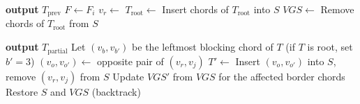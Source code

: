 \begin{algorithm}[htbp]
    \caption{ProcessFace (outer recursion)}
    \label{alg:process_face}
    \begin{algorithmic}[1]
                \State \textbf{output} $T_{\text{prev}}$ 
                \State \Return
            \EndIf
            \State $F \gets F_i$
            \State $v_r \gets$  
            \State $T_{\text{root}} \gets$ 
             
                \State \Return
            \EndIf
            \State Insert chords of $T_{\text{root}}$ into $S$
            \State $VGS \gets$ 
            \State {}
            \State Remove chords of $T_{\text{root}}$ from $S$ 
        \EndProcedure
    \end{algorithmic}
\end{algorithm}

\begin{algorithm}[htbp]
    \caption{DFS (inner recursion over local tree)}
    \label{alg:dfs_local}
    \begin{algorithmic}[1]
                \State \textbf{output} $T_{\text{partial}}$ 
            \Else
                \State {}
            \EndIf
            \State Let $(v_b, v_{b'})$ be the leftmost blocking chord of $T$ (if $T$ is root, set $b' = 3$)
                \State $(v_o, v_{o'}) \gets$ opposite pair of $(v_r, v_j)$
                \State $T' \gets$  
                \State Insert $(v_o, v_{o'})$ into $S$, remove $(v_r, v_j)$ from $S$
                \State Update $VGS'$ from $VGS$ for the affected border chords
                \State {}
                \State Restore $S$ and $VGS$ (backtrack)
            \EndFor
        \EndProcedure
    \end{algorithmic}
\end{algorithm}

